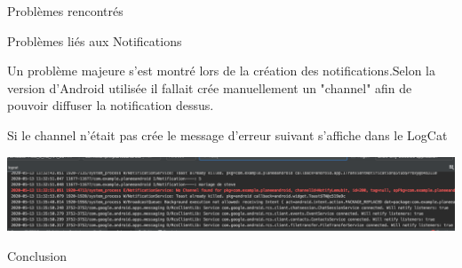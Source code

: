 \documentclass[11pt]{beamer}
\begin{document}
\begin{frame}{Problèmes rencontrés}

\begin{mybox}{Problèmes liés aux Notifications}
\begin{flushleft}
Un problème majeure s'est montré lors de la création 
des notifications.Selon la version d'Android utilisée il fallait crée manuellement un "channel" afin de pouvoir diffuser la notification dessus.
\end{flushleft}
\end{mybox}
\begin{flushleft}
Si le channel n'était pas crée le message d'erreur suivant s'affiche dans le LogCat\\ 
\medskip
\begin{minipage}{0.48\linewidth}
\includegraphics[scale=0.35]{LogcatNotif}
\end{minipage}%
\hfill
\end{flushleft}

\end{frame}


{%
\begin{frame}{Conclusion}
\end{frame}
}
\end{document}

